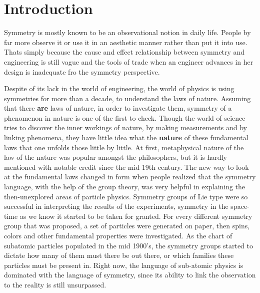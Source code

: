 \chapter{Introduction}
\thispagestyle{empty}
Symmetry is mostly known to be an observational notion in daily life. People by far more observe it  or use it in an aesthetic manner rather than put it into use. Thats simply because the cause and effect relationship between symmetry and engineering is still vague and the tools of trade when an engineer advances in her design is inadequate fro the symmetry perspective. 

Despite of its lack in the world of engineering, the world of physics is using symmetries for more than a decade, to understand the laws of nature. Assuming that there \textbf{are} laws of nature, in order to investigate them, symmetry of a phenomenon in nature is one of the first to check. Though the world of science tries to discover the inner workings of nature, by making measurements and by linking phenomena, they have little idea what the \textbf{nature} of these fundamental laws that one unfolds those little by little. At first, metaphysical nature of the law of the nature was popular amongst the philosophers, but it is hardly mentioned with notable credit since the mid 19th century. \cite{fraassen_laws_1990} The new way to look at the fundamental laws changed in form when people realized that the symmetry language, with the help of the group theory, was very helpful in explaining the then-unexplored areas of particle physics.  Symmetry groups of Lie type were so successful in interpreting the results of the experiments, symmetry in the space-time as we know it started to be taken for granted. For every different symmetry group that was proposed, a set of particles were generated on paper, then spins, colors and other fundamental properties were investigated. As the chart of subatomic particles populated in the mid 1900's, the symmetry groups started to dictate how many of them must there be out there, or which families these particles must be present in. Right now, the language of sub-atomic physics is dominated with the language of symmetry, since its ability to link the observation to the reality is still unsurpassed. \cite{penrose_road_2007}

